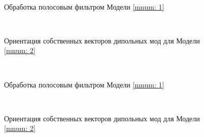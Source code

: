 \documentclass[a4paper,11pt]{article}
\begin{document}
\begin{figure}[h]
	\centering
	\begin{minipage}{0.98\linewidth}
		\centering %
		 \\
	\end{minipage}
	\caption{Обработка полосовым фильтром Модели \ref{mnum: 1}}
	\label{fig:bp_filter_graph_bs_hti_45_10x8}
\end{figure}
\begin{figure}[h]
	\centering
	\begin{minipage}{0.98\linewidth}
		\centering %
		 \\
	\end{minipage}
	\caption{Ориентация собственных векторов дипольных мод для Модели \ref{mnum: 2}}
	\label{fig:eigenvec_ang_graph_bs_hti_45_10x8}
\end{figure}

\begin{figure}[h]
	\centering
	\begin{minipage}{0.98\linewidth}
		\centering %
		 \\
	\end{minipage}
	\caption{Обработка полосовым фильтром Модели \ref{mnum: 1}}
	\label{fig:bp_filter_graph_bs_hti_45_15x10}
\end{figure}
\begin{figure}[h]
	\centering
	\begin{minipage}{0.98\linewidth}
		\centering %
		 \\
	\end{minipage}
	\caption{Ориентация собственных векторов дипольных мод для Модели \ref{mnum: 2}}
	\label{fig:eigenvec_ang_graph_bs_hti_45_15x10}
\end{figure}
\end{document}
